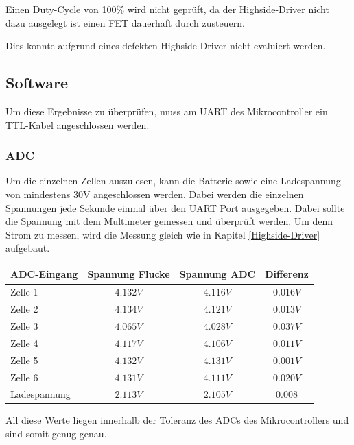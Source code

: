 Einen Duty-Cycle von 100\% wird nicht geprüft, da der Highside-Driver nicht dazu ausgelegt ist einen FET dauerhaft durch zusteuern.

Dies konnte aufgrund eines defekten Highside-Driver nicht evaluiert werden. 

\subsection{Software}
Um diese Ergebnisse zu überprüfen, muss am UART des Mikrocontroller ein TTL-Kabel angeschlossen werden.

\subsubsection*{ADC}
Um die einzelnen Zellen auszulesen, kann die Batterie sowie eine Ladespannung von mindestens 30V angeschlossen werden. Dabei werden die einzelnen Spannungen jede Sekunde einmal über den UART Port ausgegeben. Dabei sollte die Spannung mit dem Multimeter gemessen und überprüft werden. Um denn Strom zu messen, wird die Messung gleich wie in Kapitel \ref{Highside-Driver} aufgebaut. 

\begin{center}
	\begin{tabular}{|l|c|c|c|}
		\hline 
		ADC-Eingang & Spannung Flucke & Spannung ADC & Differenz \\ \hline
		Zelle 1 & $4.132V$ & $4.116V$ & $0.016V$ \\ \hline
		Zelle 2 & $4.134V$ & $4.121V$ & $0.013V$ \\ \hline
		Zelle 3 & $4.065V$ & $4.028V$ & $0.037V$ \\ \hline
		Zelle 4 & $4.117V$ & $4.106V$ & $0.011V$ \\ \hline
		Zelle 5 & $4.132V$ & $4.131V$ & $0.001V$ \\ \hline
		Zelle 6 & $4.131V$ & $4.111V$ & $0.020V$ \\ \hline
		Ladespannung & $2.113V$ & $2.105V$ & $0.008$ \\ \hline
	\end{tabular} 
	\label{tab:Spannungengemessen}
\end{center}

All diese Werte liegen innerhalb der Toleranz des ADCs des Mikrocontrollers und sind somit genug genau.

